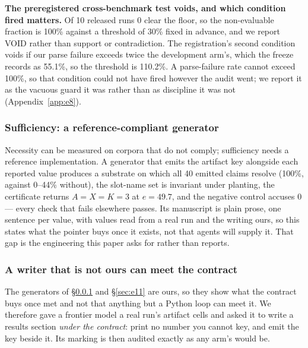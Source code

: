 \documentclass[10pt]{article}
\newcommand{\RM}[1]{{#1}}
\begin{document}
\textbf{The preregistered cross-benchmark test voids, and which condition fired
matters.} Of \RM{10} released runs \RM{0} clear the floor, so the non-evaluable
fraction is \RM{100\%} against a threshold of \RM{30\%} fixed in advance, and we
report VOID rather than support or contradiction. The registration's second condition voids if our
parse failure exceeds twice the development arm's, which the freeze records as
\RM{55.1\%}, so the threshold is \RM{110.2\%}. A parse-failure rate cannot
exceed \RM{100\%}, so that condition could not have fired however the audit went;
we report it as the vacuous guard it was rather than as discipline it was not
(Appendix~\ref{app:e8}).

\subsubsection{Sufficiency: a reference-compliant generator}
\label{sec:e10}
Necessity can be measured on corpora that do not comply; sufficiency needs a
reference implementation. A generator that emits the artifact key alongside each
reported value produces a substrate on which all \RM{40} emitted claims resolve
(\RM{100\%}, against \RM{0--44\%} without), the slot-name set is invariant under
planting, the certificate returns $A=X=K=\RM{3}$ at $e=\RM{49.7}$, and the
negative control accuses \RM{0} --- every check that fails elsewhere passes. Its
manuscript is plain prose, one sentence per value, with values read from a real
run and the writing ours, so this states what the pointer buys once it exists,
not that agents will supply it. That gap is the engineering this paper asks for
rather than reports.

\subsubsection{A writer that is not ours can meet the contract}
\label{sec:e17}
The generators of \S\ref{sec:e10} and \S\ref{sec:e11} are ours, so they show
what the contract buys once met and not that anything but a Python loop can meet
it. We therefore gave a frontier model a real run's artifact cells and asked it
to write a results section \emph{under the contract}: print no number you cannot
key, and emit the key beside it. Its marking is then audited exactly as any
arm's would be.
\end{document}
